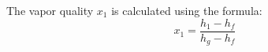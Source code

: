 The vapor quality \(x_1\) is calculated using the formula:  
\[
x_1 = \frac{h_1 - h_f}{h_g - h_f}
\]